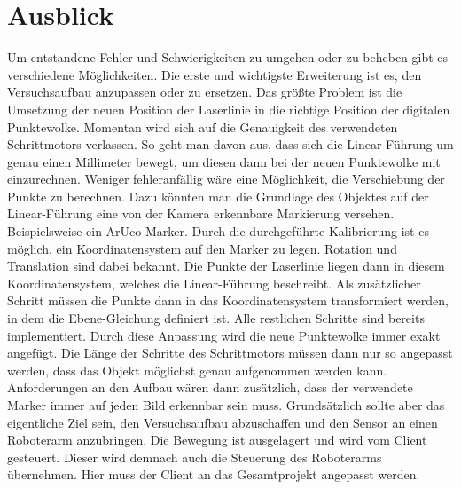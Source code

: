 \section{Ausblick}\label{ausblick}
	
	Um entstandene Fehler und Schwierigkeiten zu umgehen oder zu beheben gibt es verschiedene Möglichkeiten. Die erste und wichtigste Erweiterung ist es, den Versuchsaufbau anzupassen oder zu ersetzen. Das größte Problem ist die Umsetzung der neuen Position der Laserlinie in die richtige Position der digitalen Punktewolke. Momentan wird sich auf die Genauigkeit des verwendeten Schrittmotors verlassen. So geht man davon aus, dass sich die Linear-Führung um genau einen Millimeter bewegt, um diesen dann bei der neuen Punktewolke mit einzurechnen. Weniger fehleranfällig wäre eine Möglichkeit, die Verschiebung der Punkte zu berechnen. Dazu könnten man die Grundlage des Objektes auf der Linear-Führung eine von der Kamera erkennbare Markierung versehen. Beispielsweise ein ArUco-Marker. Durch die durchgeführte Kalibrierung ist es möglich, ein Koordinatensystem auf den Marker zu legen. Rotation und Translation sind dabei bekannt. Die Punkte der Laserlinie liegen dann in diesem Koordinatensystem, welches die Linear-Führung beschreibt. Als zusätzlicher Schritt müssen die Punkte dann in das Koordinatensystem transformiert werden, in dem die Ebene-Gleichung definiert ist. Alle restlichen Schritte sind bereits implementiert. Durch diese Anpassung wird die neue Punktewolke immer exakt angefügt. Die Länge der Schritte des Schrittmotors müssen dann nur so angepasst werden, dass das Objekt möglichst genau aufgenommen werden kann. Anforderungen an den Aufbau wären dann zusätzlich, dass der verwendete Marker immer auf jeden Bild erkennbar sein muss. \newline
	Grundsätzlich sollte aber das eigentliche Ziel sein, den Versuchsaufbau abzuschaffen und den Sensor an einen Roboterarm anzubringen. Die Bewegung ist ausgelagert und wird vom Client gesteuert. Dieser wird demnach auch die Steuerung des Roboterarms übernehmen. Hier muss der Client an das Gesamtprojekt angepasst werden. \newline
